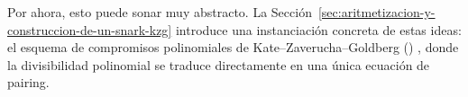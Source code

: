 Por ahora, esto puede sonar muy abstracto. La Sección~\ref{sec:aritmetizacion-y-construccion-de-un-snark-kzg} introduce una instanciación concreta de estas ideas: el esquema de compromisos polinomiales de Kate–Zaverucha–Goldberg (\KZG) \cite{Kate2010}, donde la divisibilidad polinomial se traduce directamente en una única ecuación de pairing.
